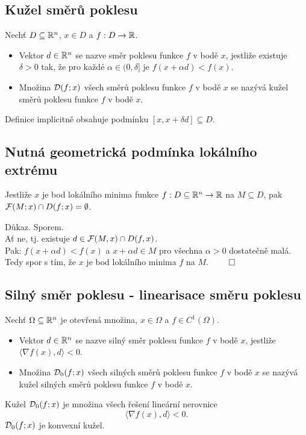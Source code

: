 \subsection{Kužel směrů poklesu}
Nechť $D \subseteq \mathbb{R}^n$, $x \in D$ a $f : D \rightarrow \mathbb{R}$.
\begin{itemize}
    \item Vektor $d \in \mathbb{R}^n$ se nazve směr poklesu funkce $f$ v bodě $x$, jestliže existuje $\delta >0$ tak, že pro
    každé $\alpha \in (0, \delta]$ je $f(x + \alpha d) < f(x)$.
    \item Množina $\mathcal{D}(f; x)$ všech směrů poklesu funkce $f$ v bodě $x$ se nazývá kužel směrů poklesu funkce $f$ v bodě
    $x$.
\end{itemize}
Definice implicitně obsahuje podmínku $[x, x+\delta d] \subseteq D$.

\subsection{Nutná geometrická podmínka lokálního extrému}
Jestliže $x$ je bod lokálního minima funkce $f : D \subseteq \mathbb{R}^n \rightarrow \mathbb{R}$ na $M \subseteq D$, pak
$\mathcal{F}(M; x) \cap D(f;x) = \emptyset$.

Důkaz. Sporem. \\
Ať ne, tj. existuje $d \in \mathcal{F}(M, x) \cap D(f, x)$.\\
Pak: $f (x + \alpha d) < f(x)$ a $x + \alpha d \in M$ pro všechna $\alpha > 0$ dostatečně malá.\\
Tedy spor s tím, že $x$ je bod lokálního minima $f$ na $M$. $\qed$

\subsection{Silný směr poklesu - linearisace směru poklesu}
Nechť $\Omega \subseteq \mathbb{R}^n$ je otevřená množina, $x \in \Omega$ a $f \in C^{1}(\Omega)$.
\begin{itemize}
    \item Vektor $d \in \mathbb{R}^n$ se nazve silný směr poklesu funkce $f$ v bodě $x$, jestliže 
    $\langle \nabla f(x), d\rangle < 0$.
    \item Množina $\mathcal{D}_0(f; x)$ všech silných směrů poklesu funkce $f$ v bodě $x$ se nazývá kužel silných směrů poklesu
    funkce $f$ v bodě $x$.
\end{itemize}
Kužel $\mathcal{D}_0(f; x)$ je množina všech řešení lineární nerovnice \[\langle \nabla f(x), d\rangle < 0.\]
$\mathcal{D}_0(f;x)$ je konvexní kužel.
\newpage
